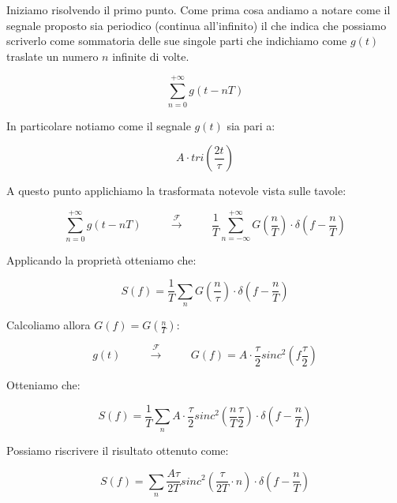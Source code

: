 \documentclass[../main.tex]{subfiles}
\begin{document}
Iniziamo risolvendo il primo punto. Come prima cosa andiamo a notare come il segnale proposto sia periodico (continua all'infinito) il che indica che possiamo scriverlo come sommatoria delle sue singole parti che indichiamo come $g(t)$ traslate un numero $n$ infinite di volte.

\begin{equation}
	\sum_{n = 0}^{+\infty} g(t - nT)
\end{equation}

In particolare notiamo come il segnale $g(t)$ sia pari a:

\begin{equation}
	A \cdot \unit{tri} \left( \frac{2t}{\tau} \right)
\end{equation}

A questo punto applichiamo la trasformata notevole vista sulle tavole:

\begin{equation}
	\sum_{n = 0}^{+\infty} g(t - nT) \hspace{1cm} \xrightarrow{\mathcal{F}}  \hspace{1cm}  \frac{1}{T} \sum_{n = - \infty}^{+\infty} G\left(\frac{n}{T}\right) \cdot \delta \left(f -  \frac{n}{T}\right)
\end{equation}

Applicando la proprietà otteniamo che:

\begin{equation}
	S(f) = \frac{1}{T} \sum_n G \left(\frac{n}{\tau}\right) \cdot \delta \left(f -  \frac{n}{T}\right)
\end{equation}

Calcoliamo allora $G(f) = G \left(\frac{n}{T}\right)$:

\begin{equation}
	g(t) \hspace{1cm} \xrightarrow{\mathcal{F}}  \hspace{1cm} G(f) = A \cdot \frac{\tau}{2} \unit{sinc}^2 \left(f \frac{\tau}{2}\right)
\end{equation}

Otteniamo che:

\begin{equation}
	S(f) = \frac{1}{T} \sum_n A \cdot \frac{\tau}{2} \unit{sinc}^2 \left(\frac{n}{T} \frac{\tau}{2}\right) \cdot \delta \left(f -  \frac{n}{T}\right)
\end{equation}

Possiamo riscrivere il risultato ottenuto come:

\begin{equation}
	S(f) = \sum_n  \frac{A \tau}{2T} \unit{sinc}^2 \left( \frac{\tau}{2T} \cdot n \right) \cdot \delta \left(f -  \frac{n}{T}\right)
\end{equation}
\end{document}
